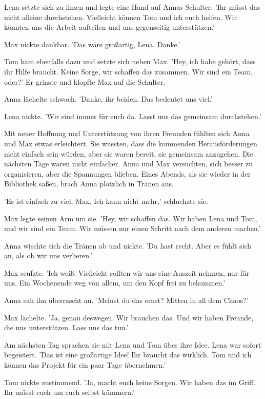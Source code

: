 \documentclass[12pt]{article}
\begin{document}
Lena setzte sich zu ihnen und legte eine Hand auf Annas Schulter. 'Ihr müsst das nicht alleine durchstehen. Vielleicht können Tom und ich euch helfen. Wir könnten uns die Arbeit aufteilen und uns gegenseitig unterstützen.'

Max nickte dankbar. 'Das wäre großartig, Lena. Danke.'

Tom kam ebenfalls dazu und setzte sich neben Max. 'Hey, ich habe gehört, dass ihr Hilfe braucht. Keine Sorge, wir schaffen das zusammen. Wir sind ein Team, oder?' Er grinste und klopfte Max auf die Schulter.

Anna lächelte schwach. 'Danke, ihr beiden. Das bedeutet uns viel.'

Lena nickte. 'Wir sind immer für euch da. Lasst uns das gemeinsam durchstehen.'

Mit neuer Hoffnung und Unterstützung von ihren Freunden fühlten sich Anna und Max etwas erleichtert. Sie wussten, dass die kommenden Herausforderungen nicht einfach sein würden, aber sie waren bereit, sie gemeinsam anzugehen. Die nächsten Tage waren nicht einfacher. Anna und Max versuchten, sich besser zu organisieren, aber die Spannungen blieben. Eines Abends, als sie wieder in der Bibliothek saßen, brach Anna plötzlich in Tränen aus.

'Es ist einfach zu viel, Max. Ich kann nicht mehr,' schluchzte sie.

Max legte seinen Arm um sie. 'Hey, wir schaffen das. Wir haben Lena und Tom, und wir sind ein Team. Wir müssen nur einen Schritt nach dem anderen machen.'

Anna wischte sich die Tränen ab und nickte. 'Du hast recht. Aber es fühlt sich an, als ob wir uns verlieren.'

Max seufzte. 'Ich weiß. Vielleicht sollten wir uns eine Auszeit nehmen, nur für uns. Ein Wochenende weg von allem, um den Kopf frei zu bekommen.'

Anna sah ihn überrascht an. 'Meinst du das ernst? Mitten in all dem Chaos?' 

Max lächelte. 'Ja, genau deswegen. Wir brauchen das. Und wir haben Freunde, die uns unterstützen. Lass uns das tun.'

Am nächsten Tag sprachen sie mit Lena und Tom über ihre Idee. Lena war sofort begeistert. 'Das ist eine großartige Idee! Ihr braucht das wirklich. Tom und ich können das Projekt für ein paar Tage übernehmen.'

Tom nickte zustimmend. 'Ja, macht euch keine Sorgen. Wir haben das im Griff. Ihr müsst euch um euch selbst kümmern.'
\end{document}
